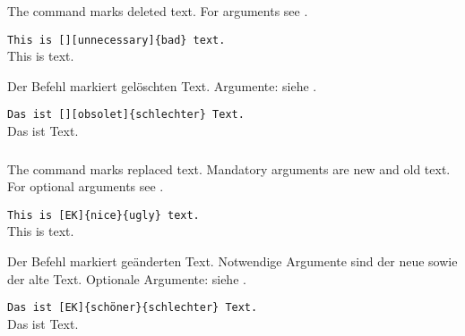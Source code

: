 \subsubsection{}
\DescribeMacro{\deleted}
\ifENGLISH
The command  marks deleted text.
For arguments see .
\begin{chusage}
\>
\end{chusage}
\begin{chusage}[true]
\>\texttt{This is [][unnecessary]\{bad\} text.}\\
\>This is  text.
\end{chusage}
\fi
\ifGERMAN
	Der Befehl  markiert gelöschten Text.
	Argumente: siehe .
	\begin{chusage}
	\>
	\end{chusage}
	\begin{chusage}[true]
	\>\texttt{Das ist [][obsolet]\{schlechter\} Text.}\\
	\>Das ist  Text.
	\end{chusage}
\fi

\subsubsection{}
\DescribeMacro{\replaced}
\ifENGLISH
The command  marks replaced text.
Mandatory arguments are new and old text.
For optional arguments see .
\begin{chusage}
\>
\end{chusage}
\begin{chusage}[true]
\>\texttt{This is [EK]\{nice\}\{ugly\} text.}\\
\>This is  text.
\end{chusage}
\fi
\ifGERMAN
	Der Befehl  markiert geänderten Text.
	Notwendige Argumente sind der neue sowie der alte Text.
	Optionale Argumente: siehe .
	\begin{chusage}
	\>
	\end{chusage}
	\begin{chusage}[true]
	\>\texttt{Das ist [EK]\{schöner\}\{schlechter\} Text.}\\
	\>Das ist  Text.
	\end{chusage}
\fi

